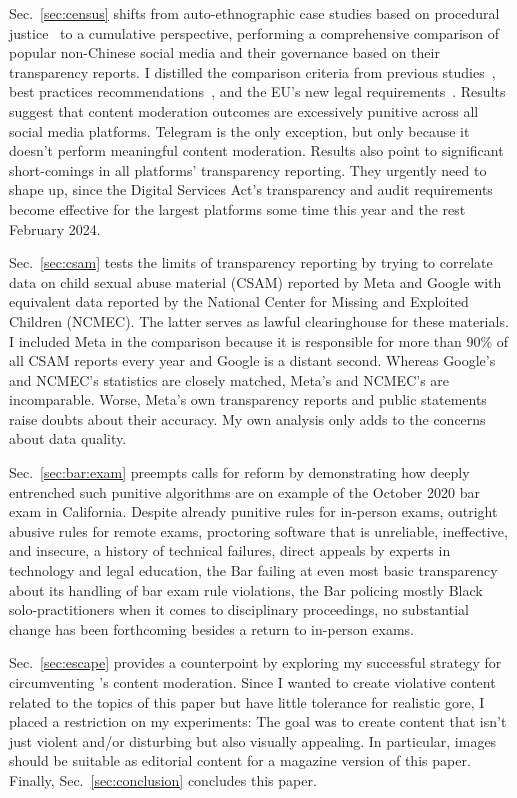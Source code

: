 Sec.\ \ref{sec:census} shifts from auto-ethnographic case studies based on
procedural justice~\cite{Tyler2003,Tyler2006,Tyler2007} to a cumulative
perspective, performing a comprehensive comparison of popular non-Chinese social
media and their governance based on their transparency reports. I distilled the
comparison criteria from previous
studies~\cite{BradfordGriselea2019,CrockerGebhartea2019}, best practices
recommendations~\cite{TheSantaClaraPrinciples2021}, and the EU's new legal
requirements~\cite{EuropeanParliamentAndCouncil2022}. Results suggest that
content moderation outcomes are excessively punitive across all social media
platforms. Telegram is the only exception, but only because it doesn't perform
meaningful content moderation. Results also point to significant short-comings
in all platforms' transparency reporting. They urgently need to shape up, since
the Digital Services Act's transparency and audit requirements become effective
for the largest platforms some time this year and the rest February 2024.

Sec.\ \ref{sec:csam} tests the limits of transparency reporting by trying to
correlate data on child sexual abuse material (CSAM) reported by Meta and Google
with equivalent data reported by the National Center for Missing and Exploited
Children (NCMEC). The latter serves as lawful clearinghouse for these materials.
I included Meta in the comparison because it is responsible for more than 90\%
of all CSAM reports every year and Google is a distant second. Whereas Google's
and NCMEC's statistics are closely matched, Meta's and NCMEC's are incomparable.
Worse, Meta's own transparency reports and public statements raise doubts about
their accuracy. My own analysis only adds to the concerns about data quality.

Sec.\ \ref{sec:bar:exam} preempts calls for reform by demonstrating how deeply
entrenched such punitive algorithms are on example of the October 2020 bar exam
in California. Despite already punitive rules for in-person exams, outright
abusive rules for remote exams, proctoring software that is unreliable,
ineffective, and insecure, a history of technical failures, direct appeals by
experts in technology and legal education, the Bar failing at even most basic
transparency about its handling of bar exam rule violations, the Bar policing
mostly Black solo-practitioners when it comes to disciplinary proceedings, no
substantial change has been forthcoming besides a return to in-person exams.

Sec.\ \ref{sec:escape} provides a counterpoint by exploring my successful
strategy for circumventing \dalle's content moderation. Since I wanted to create
violative content related to the topics of this paper but have little tolerance
for realistic gore, I placed a restriction on my experiments: The goal was to
create content that isn't just violent and/or disturbing but also visually
appealing. In particular, images should be suitable as editorial content for a
magazine version of this paper. Finally, Sec.\ \ref{sec:conclusion} concludes
this paper.

